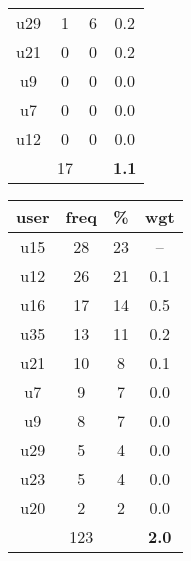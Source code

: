\begin{appendices}
\begin{table}
\begin{tabular}{ |c|c|c|c| }
	u29 & 1 & 6 & 0.2 \\
	u21 & 0 & 0 & 0.2 \\
	u9 & 0 & 0 & 0.0 \\
	u7 & 0 & 0 & 0.0 \\
	u12 & 0 & 0 & 0.0 \\
	 & 17 & & \textbf{1.1} \\
	\hline
\end{tabular}
\begin{tabular}{ |c|c|c|c| }
	\hline
	\textbf{user} & \textbf{freq} & \textbf{\%} & \textbf{wgt} \\
	\hline
	u15 & 28 & 23 & -- \\
	u12 & 26 & 21 & 0.1 \\
	u16 & 17 & 14 & 0.5 \\
	u35 & 13 & 11 & 0.2 \\
	u21 & 10 & 8 & 0.1 \\
	u7 & 9 & 7 & 0.0 \\
	u9 & 8 & 7 & 0.0 \\
	u29 & 5 & 4 & 0.0 \\
	u23 & 5 & 4 & 0.0 \\
	u20 & 2 & 2 & 0.0 \\
	 & 123 & & \textbf{2.0} \\
	\hline
\end{tabular}
\end{table}


\end{appendices}
